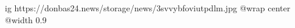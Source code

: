  
 
 
 
 

\ifcmt
  ig https://donbas24.news/storage/news/3svvybfoviutpdlm.jpg
  @wrap center
  @width 0.9
\fi
